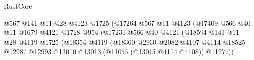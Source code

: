 \begin{lexlean}{RustCore}
\begin{coremodule}
                                                  @567
                                                  @141
                                                  @11
                                                  @28
                                                  @4123
                                                  @1725
                                                  (@17264
                                                    @567
                                                    @11
                                                    @4123
                                                    (@17409
                                                      @566
                                                      @40
                                                      @11
                                                      @1679
                                                      @4121
                                                      @1728
                                                      @954
                                                      (@17231
                                                        @566
                                                        @40
                                                        @4121
                                                        (@18594
                                                          @141
                                                          @11
                                                          @28
                                                          @4119
                                                          @1725
                                                          (@18354
                                                            @4119
                                                            (@18360
                                                              @2930
                                                              @2082
                                                              @4107
                                                              @4114
                                                              @18525
                                                              @12987
                                                              @12993
                                                              @13010
                                                              @13013
                                                              (@11045 (@13015 @4114 @4108))
                                                              @11277))

\end{coremodule}
\end{lexlean}
